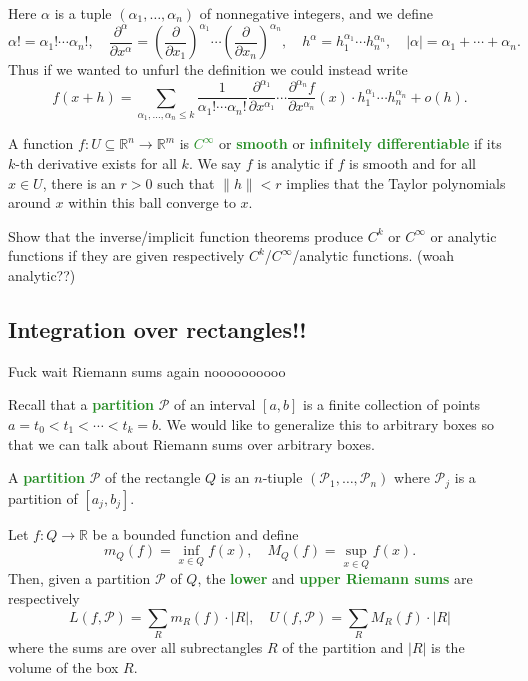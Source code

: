 \documentclass[10pt]{scrartcl}
\providecommand{\RR}{\mathbb R}
\providecommand{\vocab}[1]{{\textbf{\textcolor{ForestGreen}{#1}}}}
\begin{document}
Here $\alpha$ is a tuple $(\alpha_1,\dots,\alpha_n)$ of nonnegative integers,
and we define
\[\alpha! = \alpha_1!\cdots\alpha_n!,\quad
\frac{\partial^\alpha}{\partial x^{\alpha}} =
\left(\frac{\partial}{\partial x_1}\right)^{\alpha_1}\cdots
\left(\frac{\partial}{\partial x_n}\right)^{\alpha_n},\quad
h^\alpha = h_1^{\alpha_1}\cdots h_n^{\alpha_n},\quad
|\alpha| = \alpha_1+\cdots+\alpha_n.\]
Thus if we wanted to unfurl the definition we could instead write
\[f(x+h) = \sum_{\alpha_1,\dots,\alpha_n\le k}
\frac{1}{\alpha_1!\cdots\alpha_n!}
\frac{\partial^{\alpha_1}}{\partial x^{\alpha_1}}\cdots
\frac{\partial^{\alpha_n}f}{\partial x^{\alpha_n}}(x)\cdot
h_1^{\alpha_1}\cdots h_n^{\alpha_n} + o(h).\]

\begin{definition}
	A function $f\colon U\subseteq\RR^n\to\RR^m$ is \vocab{$C^\infty$}
	or \vocab{smooth} or \vocab{infinitely differentiable}
	if its $k$-th derivative exists for all $k$.
	We say $f$ is analytic if $f$ is smooth and
	for all $x\in U$, there is an $r > 0$ such that $\|h\| < r$ implies that
	the Taylor polynomials around $x$ within this ball converge to $x$.
\end{definition}

\begin{exercise}
	Show that the inverse/implicit function theorems produce
	$C^k$ or $C^\infty$ or analytic functions if they are given
	respectively $C^k$/$C^\infty$/analytic functions. (woah analytic??)
\end{exercise}

\subsection{Integration over rectangles!!}
Fuck wait Riemann sums again noooooooooo

Recall that a \vocab{partition} $\mathcal P$ of an interval $[a,b]$
is a finite collection of points $a = t_0 < t_1 < \cdots < t_k = b$.
We would like to generalize this to arbitrary boxes
so that we can talk about Riemann sums over arbitrary boxes.

\begin{definition}
	A \vocab{partition} $\mathcal P$ of the rectangle $Q$ is an
	$n$-tiuple $(\mathcal P_1, \dots, \mathcal P_n)$ where
	$\mathcal P_j$ is a partition of $[a_j, b_j]$.
\end{definition}


Let $f\colon Q\to\RR$ be a bounded function and define
\[m_Q(f) = \inf_{x\in Q}f(x),\quad
M_Q(f) = \sup_{x\in Q} f(x).\]
Then, given a partition $\mathcal P$ of $Q$, the
\vocab{lower} and \vocab{upper Riemann sums} are respectively
\[L(f,\mathcal P) = \sum_{R} m_R(f)\cdot |R|,\quad
U(f,\mathcal P) = \sum_{R} M_R(f)\cdot |R|\]
where the sums are over all subrectangles $R$ of the partition
and $|R|$ is the volume of the box $R$.
\end{document}
